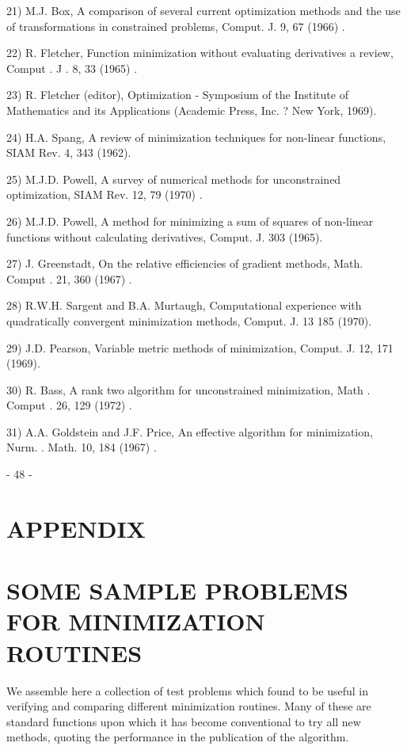 21) M.J. Box, A comparison of several current optimization methods
        and the use of transformations in constrained problems, Comput. J.
        9, 67 (1966) .
 
22) R. Fletcher, Function minimization without evaluating derivatives
        a review, Comput . J . 8, 33 (1965) .
 
23) R. Fletcher (editor), Optimization - Symposium of the Institute of
        Mathematics and its Applications  (Academic Press, Inc. ?
        New York, 1969).
 
24) H.A. Spang, A review of minimization techniques for non-linear
        functions, SIAM Rev. 4, 343 (1962).
 
25) M.J.D. Powell, A survey of numerical methods for unconstrained
        optimization, SIAM Rev. 12, 79 (1970) .
 
26) M.J.D. Powell, A method for minimizing a sum of squares of non-linear functions without calculating derivatives, Comput. J.
        303 (1965).
 
27) J. Greenstadt, On the relative efficiencies of gradient methods,
        Math. Comput . 21, 360 (1967) .
 
28) R.W.H. Sargent and B.A. Murtaugh, Computational experience with
        quadratically convergent minimization methods, Comput. J. 13
        185 (1970).
 
29) J.D. Pearson, Variable metric methods of minimization, Comput. J.
        12, 171 (1969).
 
30) R. Bass, A rank two algorithm for unconstrained minimization,
        Math . Comput . 26, 129 (1972) .
 
31) A.A. Goldstein and J.F. Price, An effective algorithm for minimization,
        Nurm.  . Math. 10, 184 (1967) .
 
 
                                - 48 -
 
 
\chapter{APPENDIX}
 
 
 \chapter{SOME SAMPLE PROBLEMS FOR MINIMIZATION ROUTINES}
 
 
     We assemble here a collection of test problems which found to be
useful in verifying and comparing different minimization routines.
Many of these are standard functions upon which it has become
conventional to try all new methods, quoting the performance in the
publication of the algorithm.
 
